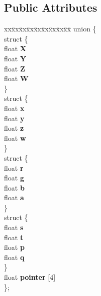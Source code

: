 \subsection*{Public Attributes}
\begin{DoxyCompactItemize}
\item 
\begin{tabbing}
xx\=xx\=xx\=xx\=xx\=xx\=xx\=xx\=xx\=\kill
union \{\\
\>struct \{\\
\>\>float {\bfseries X}\\
\>\>float {\bfseries Y}\\
\>\>float {\bfseries Z}\\
\>\>float {\bfseries W}\\
\>\} \hypertarget{unionirr_1_1core_1_1vectorSIMDf_1_1_0D12_a2c9bf9ffb2c7c051db7525644a325c23}{}\label{unionirr_1_1core_1_1vectorSIMDf_1_1_0D12_a2c9bf9ffb2c7c051db7525644a325c23}
\\
\>struct \{\\
\>\>float {\bfseries x}\\
\>\>float {\bfseries y}\\
\>\>float {\bfseries z}\\
\>\>float {\bfseries w}\\
\>\} \hypertarget{unionirr_1_1core_1_1vectorSIMDf_1_1_0D12_ab834f6a15bbf77a7cd2249f60f1db478}{}\label{unionirr_1_1core_1_1vectorSIMDf_1_1_0D12_ab834f6a15bbf77a7cd2249f60f1db478}
\\
\>struct \{\\
\>\>float {\bfseries r}\\
\>\>float {\bfseries g}\\
\>\>float {\bfseries b}\\
\>\>float {\bfseries a}\\
\>\} \hypertarget{unionirr_1_1core_1_1vectorSIMDf_1_1_0D12_ad506a219c065c4c0cfd398501e0d517a}{}\label{unionirr_1_1core_1_1vectorSIMDf_1_1_0D12_ad506a219c065c4c0cfd398501e0d517a}
\\
\>struct \{\\
\>\>float {\bfseries s}\\
\>\>float {\bfseries t}\\
\>\>float {\bfseries p}\\
\>\>float {\bfseries q}\\
\>\} \hypertarget{unionirr_1_1core_1_1vectorSIMDf_1_1_0D12_a24a176279e2f073e60a99c24d50b28d0}{}\label{unionirr_1_1core_1_1vectorSIMDf_1_1_0D12_a24a176279e2f073e60a99c24d50b28d0}
\\
\>float {\bfseries pointer} \mbox{[}4\mbox{]}\\
\}; \hypertarget{classirr_1_1core_1_1vectorSIMDf_aaee5e4d21eb60c3e59253f69d15e91f7}{}\label{classirr_1_1core_1_1vectorSIMDf_aaee5e4d21eb60c3e59253f69d15e91f7}
\\

\end{tabbing}\end{DoxyCompactItemize}


